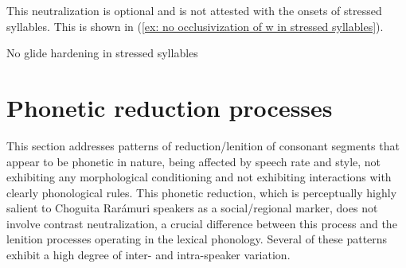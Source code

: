 This neutralization is optional and is not attested with the onsets of stressed syllables. This is shown in (\ref{ex: no occlusivization of w in stressed syllables}).

\ea\label{ex: no occlusivization of w in stressed syllables}
{No glide hardening in stressed syllables}

    \z
\z


\section{Phonetic reduction processes}
\label{sec: phonetic reduction}

This section addresses patterns of reduction/lenition of consonant segments that appear to be phonetic in nature, being affected by speech rate and style, not exhibiting any morphological conditioning and not exhibiting interactions with clearly phonological rules. This phonetic reduction, which is perceptually highly salient to Choguita Rarámuri speakers as a social/regional marker, does not involve contrast neutralization, a crucial difference between this process and the lenition processes operating in the lexical phonology. Several of these patterns exhibit a high degree of inter- and intra-speaker variation.

